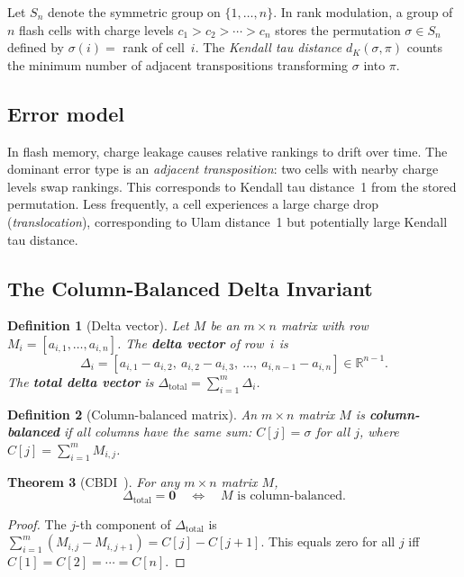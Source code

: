 \documentclass[11pt]{article}
\newtheorem{theorem}{Theorem}
\newtheorem{definition}[theorem]{Definition}
\begin{document}
Let $S_n$ denote the symmetric group on $\{1,\dots,n\}$. In rank modulation, a group of $n$ flash cells with charge levels $c_1 > c_2 > \cdots > c_n$ stores the permutation $\sigma \in S_n$ defined by $\sigma(i) = $ rank of cell~$i$. The \emph{Kendall tau distance} $d_K(\sigma,\pi)$ counts the minimum number of adjacent transpositions transforming $\sigma$ into $\pi$.

\subsection{Error model}

In flash memory, charge leakage causes relative rankings to drift over time. The dominant error type is an \emph{adjacent transposition}: two cells with nearby charge levels swap rankings. This corresponds to Kendall tau distance~1 from the stored permutation. Less frequently, a cell experiences a large charge drop (\emph{translocation}), corresponding to Ulam distance~1 but potentially large Kendall tau distance.

\subsection{The Column-Balanced Delta Invariant}

\begin{definition}[Delta vector]
Let $M$ be an $m \times n$ matrix with row $M_i = [a_{i,1}, \dots, a_{i,n}]$. The \textbf{delta vector} of row~$i$ is
\[
\Delta_i = [a_{i,1} - a_{i,2},\ a_{i,2} - a_{i,3},\ \dots,\ a_{i,n-1} - a_{i,n}] \in \mathbb{R}^{n-1}.
\]
The \textbf{total delta vector} is $\Delta_{\mathrm{total}} = \sum_{i=1}^m \Delta_i$.
\end{definition}

\begin{definition}[Column-balanced matrix]
An $m \times n$ matrix $M$ is \textbf{column-balanced} if all columns have the same sum: $C[j] = \sigma$ for all $j$, where $C[j] = \sum_{i=1}^m M_{i,j}$.
\end{definition}

\begin{theorem}[CBDI~\cite{henao2025}]\label{thm:cbdi}
For any $m \times n$ matrix $M$,
\[
\Delta_{\mathrm{total}} = \mathbf{0} \quad\Longleftrightarrow\quad \text{$M$ is column-balanced.}
\]
\end{theorem}

\begin{proof}
The $j$-th component of $\Delta_{\mathrm{total}}$ is $\sum_{i=1}^m (M_{i,j} - M_{i,j+1}) = C[j] - C[j+1]$. This equals zero for all $j$ iff $C[1] = C[2] = \cdots = C[n]$.
\end{proof}
\end{document}
